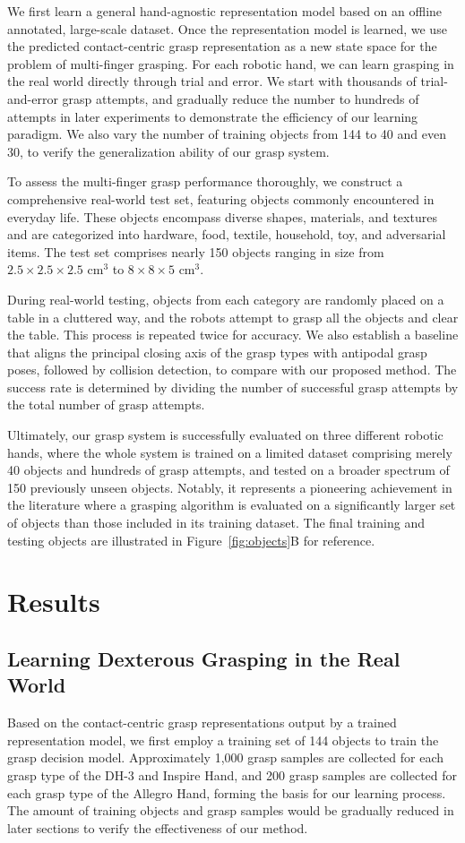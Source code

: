 We first learn a general hand-agnostic representation model based on an offline annotated, large-scale dataset. Once the representation model is learned, we use the predicted contact-centric grasp representation as a new state space for the problem of multi-finger grasping. For each robotic hand, we can learn grasping in the real world directly through trial and error. We start with thousands of trial-and-error grasp attempts, and gradually reduce the number to hundreds of attempts in later experiments to demonstrate the efficiency of our learning paradigm. We also vary the number of training objects from 144 to 40 and even 30, to verify the generalization ability of our grasp system. 

To assess the multi-finger grasp performance thoroughly, we construct a comprehensive real-world test set, featuring objects commonly encountered in everyday life. These objects encompass diverse shapes, materials, and textures and are categorized into hardware, food, textile, household, toy, and adversarial items. The test set comprises nearly 150 objects ranging in size from $2.5 \times 2.5 \times 2.5$ cm$^3$ to $8 \times 8 \times 5$ cm$^3$.

During real-world testing, objects from each category are randomly placed on a table in a cluttered way, and the robots attempt to grasp all the objects and clear the table. This process is repeated twice for accuracy. We also establish a baseline that aligns the principal closing axis of the grasp types with antipodal grasp poses, followed by collision detection, to compare with our proposed method. The success rate is determined by dividing the number of successful grasp attempts by the total number of grasp attempts.

Ultimately, our grasp system is successfully evaluated on three different robotic hands, where the whole system is trained on a limited dataset comprising merely 40 objects and hundreds of grasp attempts, and tested on a broader spectrum of 150 previously unseen objects. Notably, it represents a pioneering achievement in the literature where a grasping algorithm is evaluated on a significantly larger set of objects than those included in its training dataset. The final training and testing objects are illustrated in Figure~\ref{fig:objects}B for reference.


\section{Results}
\subsection{Learning Dexterous Grasping in the Real World}
Based on the contact-centric grasp representations output by a trained representation model, we first employ a training set of 144 objects to train the grasp decision model. Approximately 1,000 grasp samples are collected for each grasp type of the DH-3 and Inspire Hand, and 200 grasp samples are collected for each grasp type of the Allegro Hand, forming the basis for our learning process. The amount of training objects and grasp samples would be gradually reduced in later sections to verify the effectiveness of our method.

